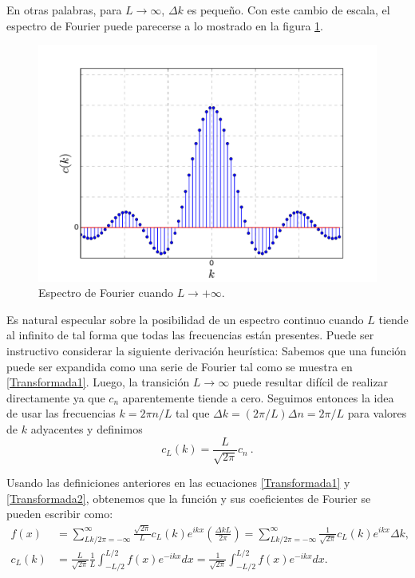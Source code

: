 En otras palabras, para $L \to \infty$, $\Delta k$ es pequeño. Con este cambio de escala, el espectro de Fourier puede parecerse a lo mostrado en la figura \ref{Espectro1}.

\begin{figure}
    \centering
    \includegraphics[scale = 0.4]{Figuras/Espectro2.pdf}
    \caption{Espectro de Fourier cuando $L \to + \infty$.}
    \label{Espectro1}
\end{figure}

Es natural especular sobre la posibilidad de un espectro continuo cuando $L$ tiende al infinito  de tal forma que todas las frecuencias están presentes. Puede ser instructivo considerar la siguiente derivación heurística: Sabemos que una función puede ser expandida como una serie de Fourier tal como se muestra en \eqref{Transformada1}. Luego, la transición $L \to \infty$ puede resultar difícil de realizar directamente ya que $c_n$ aparentemente tiende a cero. Seguimos entonces la idea de usar las frecuencias $k = 2\pi n/L$ tal que
$\Delta k = (2\pi/L ) \Delta n = 2\pi/L$ para valores de $k$ adyacentes y definimos
\begin{equation}
    c_L(k) = \frac{L}{\sqrt{2 \pi}} c_n \ .
\end{equation}

Usando las definiciones anteriores en las ecuaciones \eqref{Transformada1} y \eqref{Transformada2}, obtenemos que la función y sus coeficientes de Fourier se pueden escribir como: 
\begin{align*}
    f(x)&= \sum_{Lk/2\pi = -\infty}^{\infty} \frac{\sqrt{2\pi}}{L} c_L(k) e^{ikx} \left( \frac{\Delta k L}{2\pi}\right) = \sum_{Lk/2\pi = -\infty}^{\infty}  \frac{1}{\sqrt{2\pi}} c_L(k) e^{ikx} \Delta k , \\
  c_L(k) &= \frac{L}{\sqrt{2\pi}} \frac{1}{L} \int_{-L/2}^{L/2} f(x) e^{-ikx} dx = \frac{1}{\sqrt{2\pi}} \int_{-L/2}^{L/2} f(x) e^{-ikx} dx.
\end{align*}

